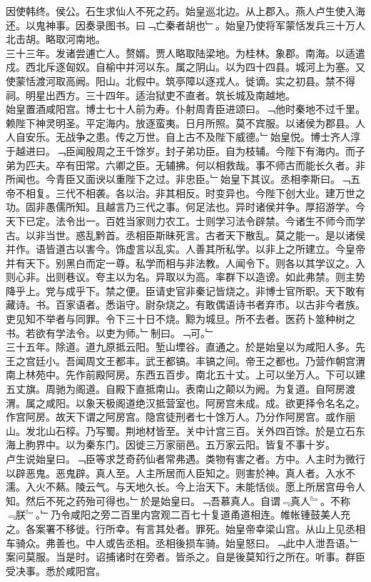 \documentclass{zhvt-classic}
\begin{document}
\hspace*{2em}因使韩终。侯公。石生求仙人不死之药。始皇巡北边。从上郡入。燕人卢生使入海还。以鬼神事。因奏录图书。曰﹁亡秦者胡也﹂。始皇乃使将军蒙恬发兵三十万人北击胡。略取河南地。\\
\hspace*{2em}三十三年。发诸尝逋亡人。赘婿。贾人略取陆梁地。为桂林。象郡。南海。以适遣戍。西北斥逐匈奴。自榆中并河以东。属之阴山。以为四十四县。城河上为塞。又使蒙恬渡河取高阙。阳山。北假中。筑亭障以逐戎人。徙谪。实之初县。禁不得祠。明星出西方。三十四年。适治狱吏不直者。筑长城及南越地。\\
\hspace*{2em}始皇置酒咸阳宫。博士七十人前为寿。仆射周青臣进颂曰。﹁他时秦地不过千里。赖陛下神灵明圣。平定海内。放逐蛮夷。日月所照。莫不宾服。以诸侯为郡县。人人自安乐。无战争之患。传之万世。自上古不及陛下威德。﹂始皇悦。博士齐人淳于越进曰。﹁臣闻殷周之王千馀岁。封子弟功臣。自为枝辅。今陛下有海内。而子弟为匹夫。卒有田常。六卿之臣。无辅拂。何以相救哉。事不师古而能长久者。非所闻也。今青臣又面谀以重陛下之过。非忠臣。﹂始皇下其议。丞相李斯曰。﹁五帝不相复。三代不相袭。各以治。非其相反。时变异也。今陛下创大业。建万世之功。固非愚儒所知。且越言乃三代之事。何足法也。异时诸侯并争。厚招游学。今天下已定。法令出一。百姓当家则力农工。士则学习法令辟禁。今诸生不师今而学古。以非当世。惑乱黔首。丞相臣斯昧死言。古者天下散乱。莫之能一。是以诸侯并作。语皆道古以害今。饰虚言以乱实。人善其所私学。以非上之所建立。今皇帝并有天下。别黑白而定一尊。私学而相与非法教。人闻令下。则各以其学议之。入则心非。出则巷议。夸主以为名。异取以为高。率群下以造谤。如此弗禁。则主势降乎上。党与成乎下。禁之便。臣请史官非秦记皆烧之。非博士官所职。天下敢有藏诗。书。百家语者。悉诣守。尉杂烧之。有敢偶语诗书者弃市。以古非今者族。吏见知不举者与同罪。令下三十日不烧。黥为城旦。所不去者。医药卜筮种树之书。若欲有学法令。以吏为师。﹂制曰。﹁可。﹂\\
\hspace*{2em}三十五年。除道。道九原抵云阳。堑山堙谷。直通之。於是始皇以为咸阳人多。先王之宫廷小。吾闻周文王都丰。武王都镐。丰镐之间。帝王之都也。乃营作朝宫渭南上林苑中。先作前殿阿房。东西五百步。南北五十丈。上可以坐万人。下可以建五丈旗。周驰为阁道。自殿下直抵南山。表南山之颠以为阙。为复道。自阿房渡渭。属之咸阳。以象天极阁道绝汉抵营室也。阿房宫未成。成。欲更择令名名之。作宫阿房。故天下谓之阿房宫。隐宫徒刑者七十馀万人。乃分作阿房宫。或作丽山。发北山石椁。乃写蜀。荆地材皆至。关中计宫三百。关外四百馀。於是立石东海上朐界中。以为秦东门。因徙三万家丽邑。五万家云阳。皆复不事十岁。\\
\hspace*{2em}卢生说始皇曰。﹁臣等求芝奇药仙者常弗遇。类物有害之者。方中。人主时为微行以辟恶鬼。恶鬼辟。真人至。人主所居而人臣知之。则害於神。真人者。入水不濡。入火不爇。陵云气。与天地久长。今上治天下。未能恬倓。愿上所居宫毋令人知。然后不死之药殆可得也。﹂於是始皇曰。﹁吾慕真人。自谓﹃真人﹄。不称﹃朕﹄。﹂乃令咸阳之旁二百里内宫观二百七十复道甬道相连。帷帐锺鼓美人充之。各案署不移徙。行所幸。有言其处者。罪死。始皇帝幸梁山宫。从山上见丞相车骑众。弗善也。中人或告丞相。丞相後损车骑。始皇怒曰。﹁此中人泄吾语。﹂案问莫服。当是时。诏捕诸时在旁者。皆杀之。自是後莫知行之所在。听事。群臣受决事。悉於咸阳宫。\\
\end{document}
